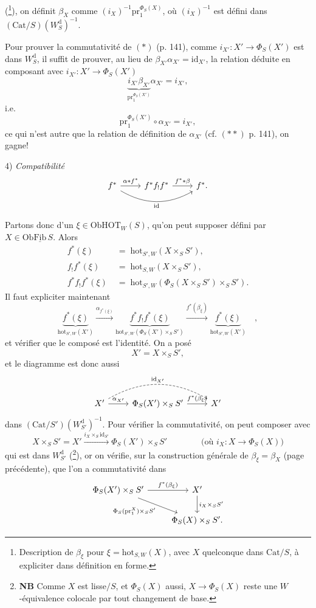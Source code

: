\documentclass[11pt]{article}
\newcommand{\printedpage}[1]{\marginpar{\footnotesize p.~#1}}
\newcommand{\msp}[1]{\marginpar{\footnotesize [#1]}}
\newcommand{\HOT}{\mathrm{HOT}}
\newcommand{\hot}{\mathrm{hot}}
\newcommand{\Cat}{\mathrm{Cat}}
\newcommand{\id}{\mathrm{id}}
\newcommand{\pr}{\mathrm{pr}}
\newcommand{\Ob}{\mathrm{Ob}}
\newcommand{\Wd}{W^{\mathrm{d}}}
\begin{document}
(\footnote[70]{Description de $\beta_\xi$ pour $\xi=\hot_{S,W}(X)$, avec $X$ quelconque dans $\Cat/S$, à expliciter dans définition en forme.}), on définit $\beta_X$ comme $(i_X)^{-1}\pr_1^{\Phi_S(X)}$, où $(i_X)^{-1}$ est défini dans $(\Cat/S)(\Wd_S)^{-1}$.

Pour prouver la commutativité de $(*)$ (p. 141), comme $i_{X'} : X'\longrightarrow\Phi_S(X')$ est dans $\Wd_S$, il suffit de prouver, au lieu de $\beta_{X'}\alpha_{X'} = \id_{X'}$, la relation déduite en composant avec $i_{X'} : X'\longrightarrow\Phi_S(X')$
\[
\underbrace{i_{X'}\beta_{X'}}_{\pr_1^{\Phi_S(X')}}\alpha_{X'} = i_{X'},
\]
i.e.
\[
\pr_1^{\Phi_S(X')}\circ\alpha_{X'} = i_{X'},
\]
ce qui n'est autre que la relation de définition de $\alpha_{X'}$ (cf. $(**)$ p. 141), on gagne!

4) \textit{Compatibilité}
\[
\begin{tikzcd}
f^* \arrow[r, "\alpha*f^*"] \arrow[rr, bend right, "\id"'] & f^*f_!f^* \arrow[r, "f^**\beta"] & f^*.
\end{tikzcd}
\]

\printedpage{88}
\leavevmode\msp{page 144}Partons donc d'un $\xi\in\Ob\HOT_W(S)$, qu'on peut supposer défini par $X\in\Ob\underline{\mathrm{Fib}}\,S$. Alors
\[
\begin{aligned}
f^*(\xi) &\;=\; \hot_{S',W}(X\times_S S'),\\
f_!f^*(\xi) &\;=\; \hot_{S,W}(X\times_S S'),\\
f^*f_!f^*(\xi) &\;=\; \hot_{S',W}(\Phi_S(X\times_S S')\times_S S').
\end{aligned}
\]
Il faut expliciter maintenant
\[
\underbrace{f^*(\xi)}_{\hot_{S',W}(X')} \xrightarrow{\alpha_{f^*(\xi)}} \underbrace{f^*f_!f^*(\xi)}_{\hot_{S',W}(\Phi_S(X')\times_S S')} \xrightarrow{f^*(\beta_\xi)} \underbrace{f^*(\xi)}_{\hot_{S',W}(X')} \quad ,
\]
et vérifier que le composé est l'identité. On a posé
\[
X' = X\times_S S',
\]
et le diagramme est donc aussi
\[
\begin{tikzcd}
X' \arrow[r, "{\alpha_{X'}}"] \arrow[rr, bend left, dashed, "{\id_{X'}}"] & \Phi_S(X')\times_S S' \arrow[r, "f^*(\beta_\xi)"] & X' %
\end{tikzcd}
\]
dans $(\Cat/S')(\Wd_{S'})^{-1}$. Pour vérifier la commutativité, on peut composer avec
\[
X\times_S S' = X' \xrightarrow{i_X\times_S\id_{S'}} \Phi_S(X')\times_S S' \qquad\qquad \text{(où } i_X : X\longrightarrow\Phi_S(X)\text{)}
\]
qui est dans $\Wd_{S'}$ (\footnote[71]{\textbf{NB} Comme $X$ est lisse$/S$, et $\Phi_S(X)$ aussi, $X\longrightarrow\Phi_S(X)$ reste une $W$-équivalence colocale par tout changement de base.}), or on vérifie, sur la construction générale de $\beta_\xi=\beta_X$ (page précédente), que l'on a commutativité dans
\[
\begin{tikzcd}
\Phi_S(X')\times_S S' \arrow[r, "f^*(\beta_\xi)"] \arrow[dr, "\Phi_S(\pr_1^X)\times_S S'"'] & X' \arrow[d, "i_X\times_S S'"] \\
 & \Phi_S(X)\times_S S'.
\end{tikzcd}
\]
\end{document}

